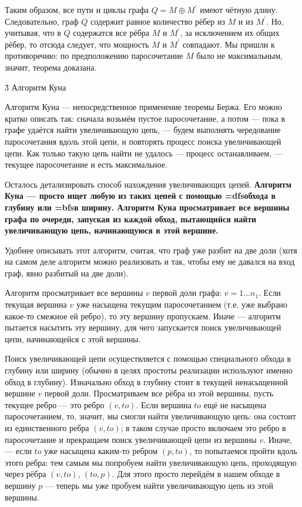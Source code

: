 Таким образом, все пути и циклы графа $Q = M \oplus M^\prime$ имеют чётную длину. Следовательно, граф $Q$ содержит равное количество рёбер из $M$ и из $M^\prime$. Но, учитывая, что в $Q$ содержатся все рёбра $M$ и $M^\prime$, за исключением их общих рёбер, то отсюда следует, что мощность $M$ и $M^\prime$ совпадают. Мы пришли к противоречию: по предположению паросочетание $M$ было не максимальным, значит, теорема доказана.


\h3{ Алгоритм Куна }

Алгоритм Куна --- непосредственное применение теоремы Бержа. Его можно кратко описать так: сначала возьмём пустое паросочетание, а потом --- пока в графе удаётся найти увеличивающую цепь, --- будем выполнять чередование паросочетания вдоль этой цепи, и повторять процесс поиска увеличивающей цепи. Как только такую цепь найти не удалось --- процесс останавливаем, --- текущее паросочетание и есть максимальное.

Осталось детализировать способ нахождения увеличивающих цепей. \bf{Алгоритм Куна} --- просто ищет любую из таких цепей с помощью \bf{\algohref=dfs{обхода в глубину}} или \bf{\algohref=bfs{в ширину}}. Алгоритм Куна просматривает все вершины графа по очереди, запуская из каждой обход, пытающийся найти увеличивающую цепь, начинающуюся в этой вершине.

Удобнее описывать этот алгоритм, считая, что граф уже разбит на две доли (хотя на самом деле алгоритм можно реализовать и так, чтобы ему не давался на вход граф, явно разбитый на две доли).

Алгоритм просматривает все вершины $v$ первой доли графа: $v = 1 \ldots n_1$. Если текущая вершина $v$ уже насыщена текущим паросочетанием (т.е. уже выбрано какое-то смежное ей ребро), то эту вершину пропускаем. Иначе --- алгоритм пытается насытить эту вершину, для чего запускается поиск увеличивающей цепи, начинающейся с этой вершины.

Поиск увеличивающей цепи осуществляется с помощью специального обхода в глубину или ширину (обычно в целях простоты реализации используют именно обход в глубину). Изначально обход в глубину стоит в текущей ненасыщенной вершине $v$ первой доли. Просматриваем все рёбра из этой вершины, пусть текущее ребро --- это ребро $(v,to)$. Если вершина $to$ ещё не насыщена паросочетанием, то, значит, мы смогли найти увеличивающую цепь: она состоит из единственного ребра $(v,to)$; в таком случае просто включаем это ребро в паросочетание и прекращаем поиск увеличивающей цепи из вершины $v$. Иначе, --- если $to$ уже насыщена каким-то ребром $(p,to)$, то попытаемся пройти вдоль этого ребра: тем самым мы попробуем найти увеличивающую цепь, проходящую через рёбра $(v,to)$, $(to,p)$. Для этого просто перейдём в нашем обходе в вершину $p$ --- теперь мы уже пробуем найти увеличивающую цепь из этой вершины.


